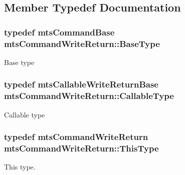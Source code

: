 \subsection{Member Typedef Documentation}
\hypertarget{classmts_command_write_return_a77f6a3a0512f7914b99f53dfe307a798}{
\subsubsection[{Base\-Type}]{\setlength{\rightskip}{0pt plus 5cm}typedef {\bf mts\-Command\-Base} {\bf mts\-Command\-Write\-Return\-::\-Base\-Type}}}\label{classmts_command_write_return_a77f6a3a0512f7914b99f53dfe307a798}
Base type \hypertarget{classmts_command_write_return_ac99dff53e64c78801540f606bb3b701b}{
\subsubsection[{Callable\-Type}]{\setlength{\rightskip}{0pt plus 5cm}typedef {\bf mts\-Callable\-Write\-Return\-Base} {\bf mts\-Command\-Write\-Return\-::\-Callable\-Type}}}\label{classmts_command_write_return_ac99dff53e64c78801540f606bb3b701b}
Callable type \hypertarget{classmts_command_write_return_a134ad936dafcef1c96fb73c9a2ff8a8d}{
\subsubsection[{This\-Type}]{\setlength{\rightskip}{0pt plus 5cm}typedef {\bf mts\-Command\-Write\-Return} {\bf mts\-Command\-Write\-Return\-::\-This\-Type}}}\label{classmts_command_write_return_a134ad936dafcef1c96fb73c9a2ff8a8d}
This type. 

